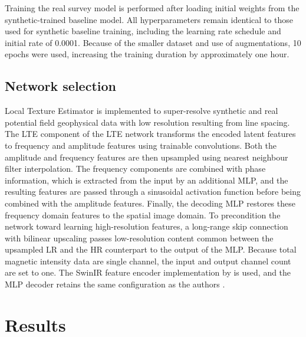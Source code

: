 Training the real survey model is performed after loading initial weights from the synthetic-trained baseline model.
All hyperparameters remain identical to those used for synthetic baseline training, including the learning rate schedule and initial rate of \num{0.0001}.
Because of the smaller dataset and use of augmentations, \num{10} epochs were used, increasing the training duration by approximately one hour.


\subsection{Network selection}
\label{sec:2lte}
Local Texture Estimator \parencite{leeLocalTextureEstimator2022} is implemented to super-resolve synthetic and real potential field geophysical data with low resolution resulting from line spacing.
The LTE component of the LTE network transforms the encoded latent features to frequency and amplitude features using trainable convolutions.
Both the amplitude and frequency features are then upsampled using nearest neighbour filter interpolation.
The frequency components are combined with phase information, which is extracted from the input by an additional MLP, and the resulting features are passed through a sinusoidal activation function before being combined with the amplitude features.
Finally, the decoding MLP restores these frequency domain features to the spatial image domain.
To precondition the network toward learning high-resolution features, a long-range skip connection with bilinear upscaling passes low-resolution content common between the upsampled LR and the HR counterpart to the output of the MLP\@.
Because total magnetic intensity data are single channel, the input and output channel count are set to one.
The SwinIR feature encoder implementation by is used, and the MLP decoder retains the same configuration as the authors \parencite{leeLocalTextureEstimator2022}.


\section{Results}
\label{sec:2results}
